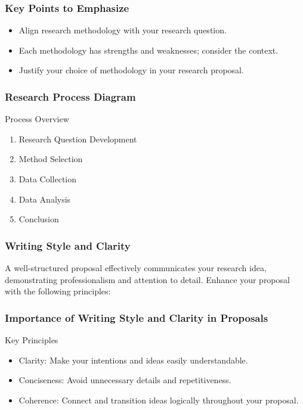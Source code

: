 \documentclass[aspectratio=169]{beamer}
\begin{document}
\begin{frame}[fragile]
    \frametitle{Key Points to Emphasize}
    \begin{itemize}
        \item Align research methodology with your research question.
        \item Each methodology has strengths and weaknesses; consider the context.
        \item Justify your choice of methodology in your research proposal.
    \end{itemize}
\end{frame}

\begin{frame}[fragile]
    \frametitle{Research Process Diagram}
    \begin{block}{Process Overview}
        \begin{enumerate}
            \item Research Question Development
            \item Method Selection
            \item Data Collection
            \item Data Analysis
            \item Conclusion
        \end{enumerate}
    \end{block}
\end{frame}

\begin{frame}[fragile]
    \frametitle{Writing Style and Clarity}
    A well-structured proposal effectively communicates your research idea, demonstrating professionalism and attention to detail. Enhance your proposal with the following principles:
\end{frame}

\begin{frame}[fragile]
    \frametitle{Importance of Writing Style and Clarity in Proposals}
    \begin{block}{Key Principles}
        \begin{itemize}
            \item Clarity: Make your intentions and ideas easily understandable.
            \item Conciseness: Avoid unnecessary details and repetitiveness.
            \item Coherence: Connect and transition ideas logically throughout your proposal.
        \end{itemize}
    \end{block}
\end{frame}
\end{document}
